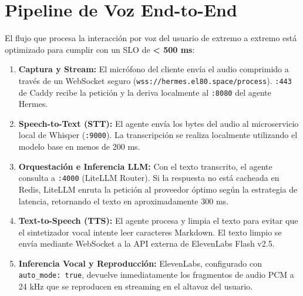 \documentclass[12pt,a4paper,openany]{book}
\newcommand{\code}[1]{\texttt{\small#1}}
\newcommand{\port}[1]{\texttt{:#1}}
\newcommand{\latency}[1]{\textbf{\color{greenok}#1}}
\begin{document}
\section{Pipeline de Voz End-to-End}
El flujo que procesa la interacción por voz del usuario de extremo a extremo está optimizado para cumplir con un SLO de \latency{< 500 ms}:
\begin{enumerate}
    \item \textbf{Captura y Stream:} El micrófono del cliente envía el audio comprimido a través de un WebSocket seguro (\code{wss://hermes.el80.space/process}).
    \port{443} de Caddy recibe la petición y la deriva localmente al \port{8080} del agente Hermes.
    \item \textbf{Speech-to-Text (STT):} El agente envía los bytes del audio al microservicio local de Whisper (\port{9000}). La transcripción se realiza localmente utilizando el modelo base en menos de 200 ms.
    \item \textbf{Orquestación e Inferencia LLM:} Con el texto transcrito, el agente consulta a \port{4000} (LiteLLM Router). Si la respuesta no está cacheada en Redis, LiteLLM enruta la petición al proveedor óptimo según la estrategia de latencia, retornando el texto en aproximadamente 300 ms.
    \item \textbf{Text-to-Speech (TTS):} El agente procesa y limpia el texto para evitar que el sintetizador vocal intente leer caracteres Markdown. El texto limpio se envía mediante WebSocket a la API externa de ElevenLabs Flash v2.5.
    \item \textbf{Inferencia Vocal y Reproducción:} ElevenLabs, configurado con \code{auto\_mode: true}, devuelve inmediatamente los fragmentos de audio PCM a 24 kHz que se reproducen en streaming en el altavoz del usuario.
\end{enumerate}
\end{document}

